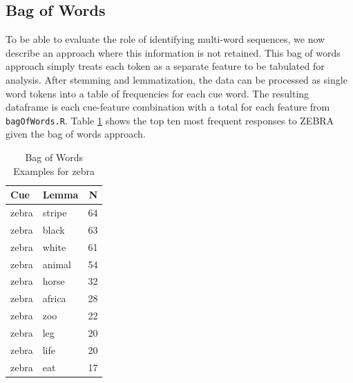 \documentclass[man]{apa6}
\newenvironment{Shaded}{\begin{snugshade}}{\end{snugshade}}
\newcommand{\CommentTok}[1]{\textcolor[rgb]{0.56,0.35,0.01}{\textit{#1}}}
\newcommand{\DataTypeTok}[1]{\textcolor[rgb]{0.13,0.29,0.53}{#1}}
\newcommand{\KeywordTok}[1]{\textcolor[rgb]{0.13,0.29,0.53}{\textbf{#1}}}
\newcommand{\NormalTok}[1]{#1}
\newcommand{\OperatorTok}[1]{\textcolor[rgb]{0.81,0.36,0.00}{\textbf{#1}}}
\newcommand{\StringTok}[1]{\textcolor[rgb]{0.31,0.60,0.02}{#1}}
\begin{document}
\hypertarget{bag-of-words}{%
\subsection{Bag of Words}\label{bag-of-words}}

To be able to evaluate the role of identifying multi-word sequences, we now describe an approach where this information is not retained. This bag of words approach simply treats each token as a separate feature to be tabulated for analysis. After stemming and lemmatization, the data can be processed as single word tokens into a table of frequencies for each cue word. The resulting dataframe is each cue-feature combination with a total for each feature from \texttt{bagOfWords.R}. Table \ref{tab:tab5} shows the top ten most frequent responses to ZEBRA given the bag of words approach.

\scriptsize

\begin{Shaded}
\end{Shaded}

\normalsize

\begin{table}[t]

\caption{\label{tab:tab5}Bag of Words Examples for zebra}
\centering
\begin{tabular}{llr}
\toprule
Cue & Lemma & N\\
\midrule
zebra & stripe & 64\\
zebra & black & 63\\
zebra & white & 61\\
zebra & animal & 54\\
zebra & horse & 32\\
\addlinespace
zebra & africa & 28\\
zebra & zoo & 22\\
zebra & leg & 20\\
zebra & life & 20\\
zebra & eat & 17\\
\bottomrule
\end{tabular}
\end{table}
\end{document}
